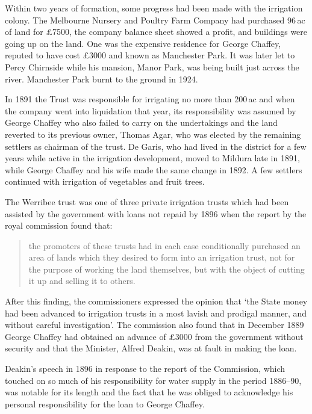 Within two years of formation, some progress had been made with the
irrigation colony.  The Melbourne Nursery and Poultry Farm Company had
purchased 96\,ac of land for \pounds7500, the company balance sheet
showed a profit, and buildings were going up on the land.  One was the
expensive residence for George Chaffey, reputed to have cost
\pounds3000 and known as Manchester Park.  It was later let to 
Percy Chirnside while his mansion, Manor Park, was being built just
across the river.  Manchester Park burnt to the ground in
1924.

In 1891 the Trust was responsible for irrigating no more than 200\,ac
and when the company went into liquidation that year, its
responsibility was assumed by George Chaffey who also failed to carry
on the undertakings and the land reverted to its previous owner,
Thomas Agar, who was elected by the remaining settlers as chairman of
the trust.  De Garis, who had lived in the district for a few years
while active in the irrigation development, moved to Mildura late in
1891, while George Chaffey and his wife made the same change in 1892.
A few settlers continued with irrigation of vegetables and fruit
trees.

The Werribee trust was one of three private irrigation trusts which
had been assisted by the government with loans not repaid by 1896 when
the report by the royal commission found that:
\begin{quote}
	the promoters of these trusts had in each case conditionally
	purchased an area of lands which they desired to form into an
	irrigation trust, not for the purpose of working the land
	themselves, but with the object of cutting it up and selling
	it to others.
\end{quote}
After this finding, the commissioners expressed the opinion that `the
State money had been advanced to irrigation trusts in a most lavish
and prodigal manner, and without careful investigation'. The
commission also found that in December 1889 George Chaffey had
obtained an advance of \pounds3000 from the government without
security and that the Minister, Alfred Deakin, was at fault in making
the loan.

Deakin's speech in 1896 in response to the report of the Commission,
which touched on so much of his responsibility for water supply in the
period 1886--90, was notable for its length and the fact that he was
obliged to acknowledge his personal responsibility for the loan to
George Chaffey.

